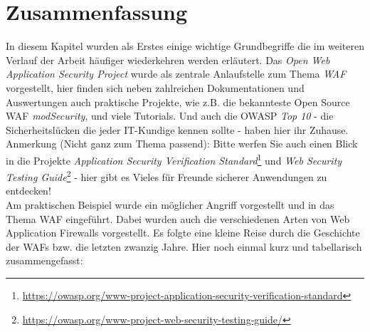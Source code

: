 \section{Zusammenfassung}

In diesem Kapitel wurden als Erstes einige wichtige Grundbegriffe die im weiteren Verlauf der Arbeit häufiger wiederkehren werden erläutert. Das \emph{Open Web Application Security Project} wurde als zentrale Anlaufstelle zum Thema \emph{WAF} vorgestellt, hier finden sich neben zahlreichen Dokumentationen und Auswertungen auch praktische Projekte, wie z.B. die bekannteste Open Source WAF \emph{modSecurity}, und viele Tutorials. Und auch die OWASP \emph{Top 10} - die Sicherheitslücken die jeder IT-Kundige kennen sollte - haben hier ihr Zuhause. \\

\textcolor{bhtGray}{ Anmerkung (Nicht ganz zum Thema passend):} Bitte werfen Sie auch einen Blick in die Projekte \emph{Application Security Verification Standard}\footnote{\url{https://owasp.org/www-project-application-security-verification-standard}} und \emph{Web Security Testing Guide}\footnote{\url{https://owasp.org/www-project-web-security-testing-guide/}} - hier gibt es Vieles für Freunde sicherer Anwendungen zu entdecken! \\

Am praktischen Beispiel wurde ein möglicher Angriff vorgestellt und in das Thema WAF eingeführt. Dabei wurden auch die verschiedenen Arten von Web Application Firewalls vorgestellt. Es folgte eine kleine Reise durch die Geschichte der WAFs bzw. die letzten zwanzig Jahre. Hier noch einmal kurz und tabellarisch zusammengefasst:\\

